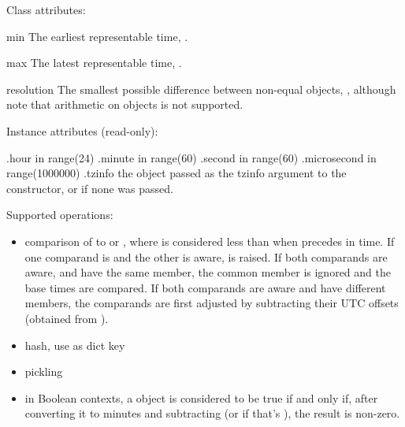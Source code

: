 Class attributes:

\begin{memberdesc}{min}
        The earliest representable time, .
\end{memberdesc}

\begin{memberdesc}{max}
        The latest representable time, .
\end{memberdesc}

\begin{memberdesc}{resolution}
        The smallest possible difference between non-equal 
        objects, , although note that
        arithmetic on  objects is not supported.
\end{memberdesc}

Instance attributes (read-only):

    .hour           in range(24)
    .minute         in range(60)
    .second         in range(60)
    .microsecond    in range(1000000)
    .tzinfo         the object passed as the tzinfo argument to the
                     constructor, or  if none
                    was passed.

Supported operations:

\begin{itemize}
  \item
    comparison of  to  or ,
    where  is considered less than  when  precedes
     in time.  If one comparand is {\naive} and the other is aware,
     is raised.  If both comparands are aware, and
    have the same  member, the common 
    member is ignored and the base times are compared.  If both
    comparands are aware and have different  members,
    the comparands are first adjusted by subtracting their UTC offsets
    (obtained from ).

  \item
    hash, use as dict key

  \item
    pickling

  \item
    in Boolean contexts, a  object is considered to be
    true if and only if, after converting it to minutes and
    subtracting  (or  if that's
    ), the result is non-zero.
\end{itemize}


